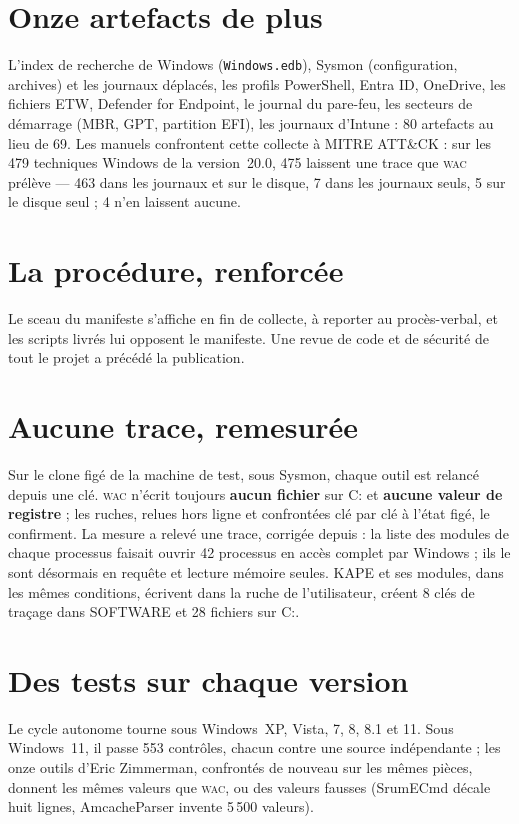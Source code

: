 \documentclass[10pt,a4paper,twocolumn]{article}
\newcommand{\wac}{\textsc{wac}}
\newcommand{\fichier}[1]{\texttt{#1}}
\begin{document}
\section{Onze artefacts de plus}
L'index de recherche de Windows (\fichier{Windows.edb}), Sysmon (configuration,
archives) et les journaux déplacés, les profils PowerShell, Entra ID, OneDrive,
les fichiers ETW, Defender for Endpoint, le journal du pare-feu, les secteurs
de démarrage (MBR, GPT, partition EFI), les journaux d'Intune : 80 artefacts
au lieu de 69. Les manuels confrontent cette collecte à MITRE ATT\&CK : sur les
479 techniques Windows de la version~20.0, 475 laissent une trace que \wac{}
prélève --- 463 dans les journaux et sur le disque, 7 dans les journaux seuls,
5 sur le disque seul ; 4 n'en laissent aucune.

\section{La procédure, renforcée}
Le sceau du manifeste s'affiche en fin de collecte, à reporter au
procès-verbal, et les scripts livrés lui opposent le manifeste. Une revue de code et
de sécurité de tout le projet a précédé la publication.

\section{Aucune trace, remesurée}
Sur le clone figé de la machine de test, sous Sysmon, chaque outil est relancé
depuis une clé. \wac{} n'écrit toujours \textbf{aucun fichier} sur C: et
\textbf{aucune valeur de registre} ; les ruches, relues hors ligne et
confrontées clé par clé à l'état figé, le confirment. La mesure a relevé une
trace, corrigée depuis : la liste des modules de chaque processus faisait
ouvrir 42 processus en accès complet par Windows ; ils le sont désormais en
requête et lecture mémoire seules. KAPE et ses modules, dans les mêmes
conditions, écrivent dans la ruche de l'utilisateur, créent 8 clés de traçage
dans SOFTWARE et 28 fichiers sur C:.

\section{Des tests sur chaque version}
Le cycle autonome tourne sous Windows~XP, Vista, 7, 8, 8.1 et 11. Sous
Windows~11, il passe 553 contrôles, chacun contre une source indépendante ;
les onze outils d'Eric Zimmerman, confrontés de nouveau sur les mêmes pièces,
donnent les mêmes valeurs que \wac{}, ou des valeurs fausses (SrumECmd décale
huit lignes, AmcacheParser invente 5\,500 valeurs).
\end{document}
